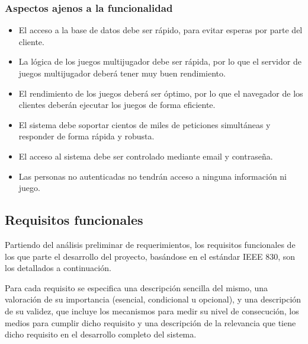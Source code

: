 \subsubsection{Aspectos ajenos a la funcionalidad}

\begin{itemize}
\item El acceso a la base de datos debe ser rápido, para evitar esperas por parte del cliente.
\item La lógica de los juegos multijugador debe ser rápida, por lo que el servidor de juegos multijugador deberá tener muy buen rendimiento.
\item El rendimiento de los juegos deberá ser óptimo, por lo que el navegador de los clientes deberán ejecutar los juegos de forma eficiente.
\item El sistema debe soportar cientos de miles de peticiones simultáneas y responder de forma rápida y robusta.
\item El acceso al sistema debe ser controlado mediante email y contraseña.
\item Las personas no autenticadas no tendrán acceso a ninguna información ni juego.
\end{itemize}


\subsection{Requisitos funcionales}

Partiendo del análisis preliminar de requerimientos, los requisitos funcionales de los que parte el desarrollo del proyecto, basándose en el estándar IEEE 830, son los detallados a continuación. 

Para cada requisito se especifica una descripción sencilla del mismo, una valoración de su importancia (esencial, condicional u opcional), y una descripción de su validez, que incluye los mecanismos para medir su nivel de consecución, los medios para cumplir dicho requisito y una descripción de la relevancia que tiene dicho requisito en el desarrollo completo del sistema.

\renewcommand{\labelenumi}{\bf RF-\arabic{enumi}}

